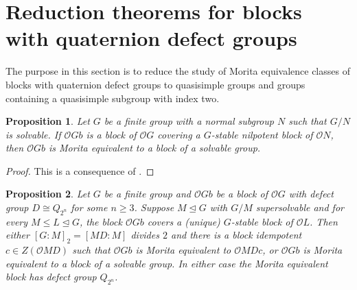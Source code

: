 \documentclass{amsart}
\theoremstyle{plain}\newtheorem{Theorem}{Theorem}[section]
\theoremstyle{plain}\newtheorem{Conjecture}[Theorem]{Conjecture}
\theoremstyle{plain}\newtheorem{Corollary}[Theorem]{Corollary}
\theoremstyle{plain}\newtheorem{Lemma}[Theorem]{Lemma}
\theoremstyle{plain}\newtheorem{Proposition}[Theorem]{Proposition}
\theoremstyle{definition}\newtheorem{Definition}[Theorem]{Definition}
\theoremstyle{definition}\newtheorem{Example}[Theorem]{Example}
\theoremstyle{definition}\newtheorem{Examples}[Theorem]{Examples}
\theoremstyle{definition}\newtheorem{Exercise}[Theorem]{Exercise}
\theoremstyle{definition}\newtheorem{Notation}[Theorem]{Notation}
\theoremstyle{definition}\newtheorem{Remark}[Theorem]{Remark}
\theoremstyle{definition}\newtheorem{Remarks}[Theorem]{Remarks}
\def\CO{{\mathcal{O}}}    \def\OPE{{\mathcal{O}(P\rtimes E)}}
\numberwithin{equation}{section}
\begin{document}
\section{Reduction theorems for blocks with quaternion defect groups}\label{sec:redthms}

The purpose in this section is to reduce the study of Morita equivalence classes of blocks with quaternion defect groups to quasisimple groups and groups containing a quasisimple subgroup with index two.



\begin{Proposition}
    Let $G$ be a finite group with a normal subgroup $N$  such that $G/N$ is solvable. If $\CO G b$ is a block of $\CO G$ covering a $G$-stable nilpotent block of $\CO N$, then $\CO G b$ is Morita equivalent to a block of a solvable group. 
\end{Proposition}
\begin{proof}
  This is a consequence of \cite[Prop.~2.2]{EatonDefectThree}.
\end{proof}






\begin{Proposition}
Let $G$ be a finite group and $\CO G b$ be a block of $\CO G$ with defect group $D \cong Q_{2^n}$ for some $n \geq 3$. Suppose $M \unlhd G$ with $G/M$ supersolvable and for every $M \leq L \unlhd G$, the block $\CO Gb$ covers a (unique) $G$-stable block of $\CO L$. Then either $[G:M]_2=[MD:M]$ divides $2$ and there is a block idempotent $c\in Z(\CO MD)$ such that $\CO Gb$ is Morita equivalent to $\CO MDc$, or $\CO G b$ is Morita equivalent to a block of a solvable group. In either case the Morita equivalent block has defect group $Q_{2^n}$. 
  
  
 
\end{Proposition}
\end{document}
